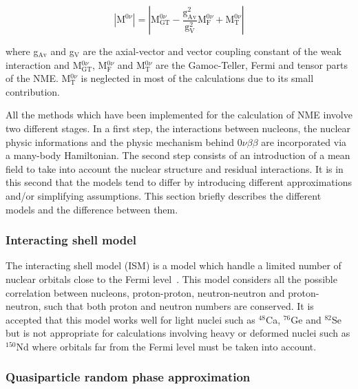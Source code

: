 \documentclass[main.tex]{subfiles}
\begin{document}
\begin{equation}
|\text{M}^{0\nu}| = |\text{M}_{\text{GT}}^{0\nu} - \frac{\text{g}_{\text{Av}}^\text{2}}{\text{g}_\text{V}^\text{2}} \text{M}_\text{F}^{0\nu} + \text{M}_\text{T}^{0\nu}|
\end{equation}


\bigskip


\NI where g$_{\text{Av}}$ and g$_\text{V}$ are the axial-vector and vector coupling constant of the weak interaction and M$_{\text{GT}}^{0\nu}$, M$_{\text{F}}^{0\nu}$ and M$_{\text{T}}^{0\nu}$ are the Gamoc-Teller, Fermi and tensor parts of the NME. M$_{\text{T}}^{0\nu}$ is neglected in most of the calculations due to its small contribution.


\bigskip


\NI All the methods which have been implemented for the calculation of NME involve two different stages. In a first step, the interactions between nucleons, the nuclear physic informations and the physic mechanism behind 0$\nu\beta\beta$ are incorporated via a many-body Hamiltonian. The second step consists of an introduction of a mean field to take into account the nuclear structure and residual interactions. It is in this second that the models tend to differ by introducing different approximations and/or simplifying assumptions. This section briefly describes the different models and the difference between them. %


\subsubsection{Interacting shell model}


\NI The interacting shell model (ISM) is a model which handle a limited number of nuclear orbitals close to the Fermi level~\cite{ISM_1,ISM_2,ISM_3,ISM_4}. This model considers all the possible correlation between nucleons, proton-proton, neutron-neutron and proton-neutron, such that both proton and neutron numbers are conserved. It is accepted that this model works well for light nuclei such as $^{\text{48}}$Ca, $^{\text{76}}$Ge and $^{\text{82}}$Se but is not appropriate for calculations involving heavy or deformed nuclei such as $^{\text{150}}$Nd where orbitals far from the Fermi level must be taken into account.


\subsubsection{Quasiparticle random phase approximation}
\end{document}
